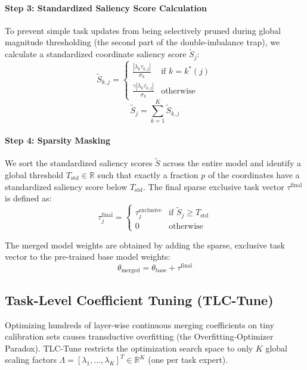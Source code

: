 \paragraph{Step 3: Standardized Saliency Score Calculation}
To prevent simple task updates from being selectively pruned during global magnitude thresholding (the second part of the double-imbalance trap), we calculate a standardized coordinate saliency score $\tilde{S}_j$:
\begin{equation}
\label{eq:standardized_saliency_k}
\tilde{S}_{k, j} = \begin{cases} \frac{|\lambda_k \tau_{k, j}|}{\sigma_k} & \text{if } k = k^*(j) \\ \frac{\gamma |\lambda_k \tau_{k, j}|}{\sigma_k} & \text{otherwise} \end{cases}
\end{equation}
\begin{equation}
\label{eq:standardized_saliency_total}
\tilde{S}_j = \sum_{k=1}^K \tilde{S}_{k, j}
\end{equation}

\paragraph{Step 4: Sparsity Masking}
We sort the standardized saliency scores $\tilde{S}$ across the entire model and identify a global threshold $T_{\text{std}} \in \mathbb{R}$ such that exactly a fraction $p$ of the coordinates have a standardized saliency score below $T_{\text{std}}$. The final sparse exclusive task vector $\tau^{\text{final}}$ is defined as:
\begin{equation}
\label{eq:sparsity_masking}
\tau^{\text{final}}_j = \begin{cases} \tau^{\text{exclusive}}_j & \text{if } \tilde{S}_j \ge T_{\text{std}} \\ 0 & \text{otherwise} \end{cases}
\end{equation}

The merged model weights are obtained by adding the sparse, exclusive task vector to the pre-trained base model weights:
\begin{equation}
\label{eq:merged_model_weights}
\theta_{\text{merged}} = \theta_{\text{base}} + \tau^{\text{final}}
\end{equation}

\subsection{Task-Level Coefficient Tuning (TLC-Tune)}
Optimizing hundreds of layer-wise continuous merging coefficients on tiny calibration sets causes transductive overfitting (the Overfitting-Optimizer Paradox). TLC-Tune restricts the optimization search space to only $K$ global scaling factors $\Lambda = [\lambda_1, \dots, \lambda_K]^T \in \mathbb{R}^K$ (one per task expert). 

